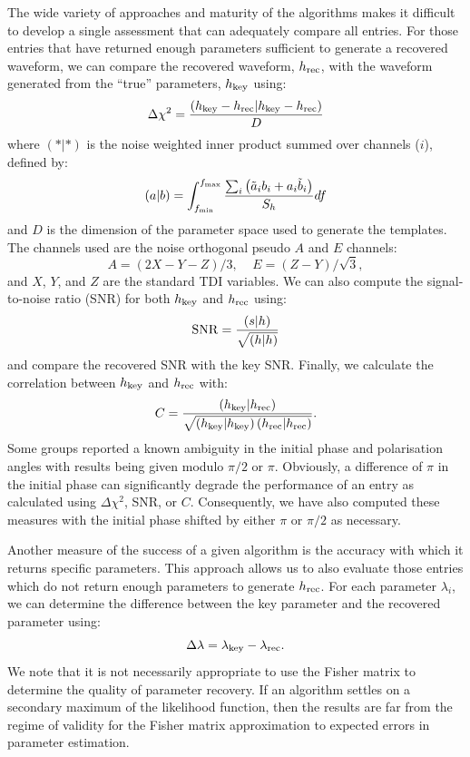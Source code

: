 \documentclass[12pt]{iopart}
\begin{document}
The wide variety of approaches and maturity of the algorithms makes it difficult to develop a single assessment that can adequately compare all entries. For those entries that have returned enough parameters sufficient to generate a recovered waveform, we can compare the recovered waveform, $h_{\rm rec}$, with the waveform generated from the ``true'' parameters, $h_{\rm key}$ using:
\begin{equation}
\label{deltachi}
\Delta \chi^2 = \frac{\left(h_{\rm key} - h_{\rm rec}|h_{\rm key} - h_{\rm rec}\right)}{D}
\end{equation}
where $(*|*)$ is the noise weighted inner product summed over channels ($i$), defined by:
\begin{equation}
\left(a|b\right) = \int_{f_{\rm min}}^{f_{\rm max}}{\frac{\sum_{i}{\left(\tilde{a}_ib_i+a_i\tilde{b}_i\right)}}{S_h}df}
\end{equation}
and $D$ is the dimension of the parameter space used to generate the templates. The channels used are the noise orthogonal pseudo $A$ and $E$ channels:
\begin{equation}
A = \left(2X - Y - Z\right)/3,~~~~~E = \left(Z - Y\right)/\sqrt{3},
\end{equation}
and $X$, $Y$, and $Z$ are the standard TDI variables. We can also compute the signal-to-noise ratio (SNR) for both $h_{\rm key}$ and $h_{\rm rec}$ using:
\begin{equation}
\label{snr}
{\rm SNR} = \frac{\left(s|h\right)}{\sqrt{\left(h|h\right)}}
\end{equation}
and compare the recovered SNR with the key SNR. Finally, we calculate the correlation between $h_{\rm key}$ and $h_{\rm rec}$ with:
\begin{equation}
\label{cor}
C = \frac{\left(h_{\rm key}|h_{\rm rec}\right)}{\sqrt{\left(h_{\rm key}|h_{\rm key}\right)\left(h_{\rm rec}|h_{\rm rec}\right)}}.
\end{equation}
Some groups reported a known ambiguity in the initial phase and polarisation angles with results being given modulo $\pi/2$ or $\pi$. Obviously, a difference of $\pi$ in the initial phase can significantly degrade the performance of an entry as calculated using $\Delta\chi^2$, SNR, or $C$. Consequently, we have also computed these measures with the initial phase shifted by either $\pi$ or $\pi/2$ as necessary.

Another measure of the success of a given algorithm is the accuracy with which it returns specific parameters. This approach allows us to also evaluate those entries which do not return enough parameters to generate $h_{\rm rec}$. For each parameter $\lambda_i$, we can determine the difference between the key parameter and the recovered parameter using:
\begin{equation}
\Delta\lambda = \lambda_{\rm key} - \lambda_{\rm rec}.
\end{equation}
We note that it is not necessarily appropriate to use the Fisher matrix to determine the quality of parameter recovery. If an algorithm settles on a secondary maximum of the likelihood function, then the results are far from the regime of validity for the Fisher matrix approximation to expected errors in parameter estimation.
\end{document}
